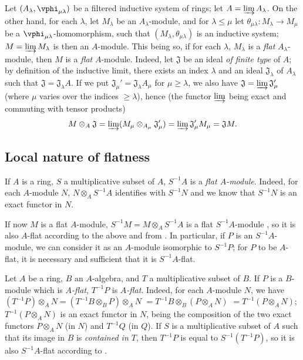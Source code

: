 \begin{env}[6.2.3]
\label{0.6.2.3}
Let $(A_\lambda,\vphi_{\mu\lambda})$ be a filtered inductive system of rings;
let $A=\varinjlim A_\lambda$. On the other hand, for each $\lambda$, let
$M_\lambda$ be an $A_\lambda$-module, and for $\lambda\leq\mu$ let
$\theta_{\mu\lambda}:M_\lambda\to M_\mu$ be a $\vphi_{\mu\lambda}$-homomorphism,
such that $(M_\lambda,\theta_{\mu\lambda})$ is an inductive system;
$M=\varinjlim M_\lambda$ is then an $A$-module. This being so, if for each
$\lambda$, $M_\lambda$ is a \emph{flat} $A_\lambda$-module, then $M$ is a
\emph{flat} $A$-module. Indeed, let $\mathfrak{J}$ be an ideal \emph{of finite
type} of $A$; by definition of the inductive limit, there exists an index
$\lambda$ and an ideal $\mathfrak{J}_\lambda$ of $A_\lambda$ such that
$\mathfrak{J}=\mathfrak{J}_\lambda A$. If we put
$\mathfrak{J}_\mu'=\mathfrak{J}_\lambda A_\mu$ for $\mu\geq\lambda$, we
also have $\mathfrak{J}=\varinjlim\mathfrak{J}_\mu'$ (where $\mu$ varies over
the indices $\geq\lambda$), hence (the functor $\varinjlim$ being exact and
commuting with tensor products)
\[
  M\otimes_A\mathfrak{J}=\varinjlim(M_\mu\otimes_{A_\mu}\mathfrak{J}_\mu')
  =\varinjlim\mathfrak{J}_\mu' M_\mu=\mathfrak{J}M.
\]
\end{env}

\subsection{Local nature of flatness}
\label{subsection:0.6.3}

\begin{env}[6.3.1]
\label{0.6.3.1}
If $A$ is a ring, $S$ a multiplicative subset of $A$, $S^{-1}A$ is a \emph{flat $A$-module}.
Indeed, for each $A$-module $N$, $N\otimes_A S^{-1}A$ identifies with $S^{-1}N$ 
and we know  that $S^{-1}N$ is an exact functor in $N$.

If now $M$ is a flat $A$-module, $S^{-1}M=M\otimes_A S^{-1}A$ is a flat
$S^{-1}A$-module , so it is also $A$-flat according to the
above and from . In particular, if $P$ is an $S^{-1}A$-module,
we can consider it as an $A$-module isomorphic to $S^{-1}P$; for $P$ to be
$A$-flat, it is necessary and sufficient that it is $S^{-1}A$-flat.
\end{env}

\begin{env}[6.3.2]
\label{0.6.3.2}
Let $A$ be a ring, $B$ an $A$-algebra, and $T$ a multiplicative subset of $B$.
If $P$ is a $B$-module which is \emph{$A$-flat}, $T^{-1}P$ is \emph{$A$-flat}.
Indeed, for each $A$-module $N$, we have
$(T^{-1}P)\otimes_A N=(T^{-1}B\otimes_B P)\otimes_A N$
$=T^{-1}B\otimes_B(P\otimes_A N)$
$=T^{-1}(P\otimes_A N)$; $T^{-1}(P\otimes_A N)$ is an exact functor in $N$,
being the composition of the two exact functors $P\otimes_A N$ (in $N$) and
$T^{-1}Q$ (in $Q$). If $S$ is a multiplicative subset of $A$ such that its image
in $B$ is \emph{contained in $T$}, then $T^{-1}P$ is equal to $S^{-1}(T^{-1}P)$,
so it is also $S^{-1}A$-flat according to .
\end{env}

